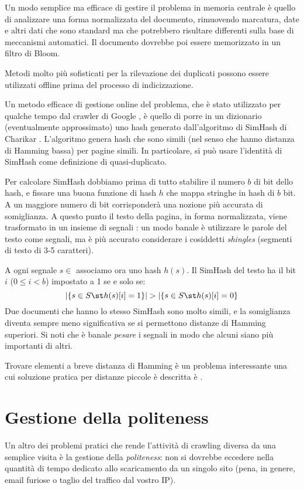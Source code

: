 Un modo semplice ma efficace di gestire il problema in memoria centrale è quello di analizzare una forma normalizzata del documento, rimuovendo marcatura, date e altri dati che sono standard ma che potrebbero risultare differenti sulla base di meccanismi automatici. Il documento dovrebbe poi essere memorizzato in un filtro di Bloom.

Metodi molto più sofisticati per la rilevazione dei duplicati possono essere utilizzati offline prima del processo di indicizzazione.

Un metodo efficace di gestione online del problema, che è stato utilizzato per qualche tempo dal crawler di Google \cite{simhashgoogle}, è quello di porre in un dizionario (eventualmente approssimato) uno hash generato dall'algoritmo di SimHash di Charikar \cite{SimHash}. L'algoritmo genera hash che sono simili (nel senso che hanno distanza di Hamming bassa) per pagine simili. In particolare, si può usare l'identità di SimHash come definizione di quasi-duplicato.

Per calcolare SimHash dobbiamo prima di tutto stabilire il numero $b$ di bit dello hash, e fissare una buona funzione di hash $h$ che mappa stringhe in hash di $b$ bit. A un maggiore numero di bit corrisponderà una nozione più accurata di somiglianza. A questo punto il testo della pagina, in forma normalizzata, viene trasformato in un insieme di segnali : un modo banale è utilizzare le parole del testo come segnali, ma è più accurato considerare i cosiddetti \textit{shingles} (segmenti di testo di 3-5 caratteri).

A ogni segnale $s \in$  associamo ora uno hash $h(s)$. Il SimHash del testo ha il bit $i$ ($0 \leq i < b$) impostato a 1 se e solo se:
\begin{equation*}
    |\{s \in S \st h(s)[i] = 1\}| > |\{s \in S \st h(s)[i] = 0\}
\end{equation*}
Due documenti che hanno lo stesso SimHash sono molto simili, e la somiglianza diventa sempre meno significativa se si permettono distanze di Hamming superiori. Si noti che è banale \textit{pesare} i segnali in modo che alcuni siano più importanti di altri.

Trovare elementi a breve distanza di Hamming è un problema interessante una cui soluzione pratica per distanze piccole è descritta è \cite{google}.

\section{Gestione della politeness}
Un altro dei problemi pratici che rende l'attività di crawling diversa da una semplice visita è la gestione della \textit{politeness}: non si dovrebbe eccedere nella quantità di tempo dedicato allo scaricamento da un singolo sito (pena, in genere, email furiose o taglio del traffico dal vostro IP).

